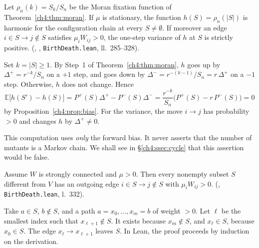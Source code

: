 \begin{proposition}\label{ch4:prop:harmgraph}
Let $\rho_n(k)=S_k/S_n$ be the Moran fixation function of Theorem~\ref{ch4:thm:moran}. If $\mu$ is
stationary, the function $h(S)=\rho_n(|S|)$ is harmonic for the configuration chain at every
$S\ne\emptyset$. If moreover an edge $i\in S\to j\notin S$ satisfies $\mu_iW_{ij}>0$, the one-step variance of $h$ at
$S$ is strictly positive. \tierA{} (, ,
\texttt{BirthDeath.lean}, ll.~285--328).
\end{proposition}

\begin{humanproof}
Set $k=|S|\ge1$. By Step~1 of Theorem~\ref{ch4:thm:moran}, $h$ goes up by $\Delta^{+}=r^{-k}/S_n$ on a
$+1$ step, and goes down by $\Delta^{-}=r^{-(k-1)}/S_n=r\,\Delta^{+}$ on a $-1$ step. Otherwise, $h$ does not change. Hence
\[
\mathbb E\bigl[h(S')-h(S)\bigr]=P^{+}(S)\Delta^{+}-P^{-}(S)\Delta^{-}=\frac{r^{-k}}{S_n}\bigl(P^{+}(S)-r\,P^{-}(S)\bigr)=0
\]
by Proposition~\ref{ch4:prop:bias}. For the variance, the move $i\to j$ has probability $>0$ and changes
$h$ by $\Delta^{+}\ne0$.
\end{humanproof}

This computation uses \emph{only} the forward bias. It never asserts that the number of mutants is a Markov
chain. We shall see in §\ref{ch4:ssec:cycle} that this assertion would be false.

\begin{lemma}\label{ch4:lem:conn}
Assume $W$ is strongly connected and $\mu>0$. Then every nonempty subset $S$ different from $V$ has an outgoing
edge $i\in S\to j\notin S$ with $\mu_iW_{ij}>0$. \tierA{} (,
\texttt{BirthDeath.lean}, l.~332).
\end{lemma}

\begin{humanproof}
Take $a\in S$, $b\notin S$, and a path $a=x_0,\dots,x_m=b$ of weight $>0$. Let $\ell$ be the smallest index such
that $x_{\ell+1}\notin S$. It exists because $x_m\notin S$, and $x_\ell\in S$, because $x_0\in S$. The edge
$x_\ell\to x_{\ell+1}$ leaves $S$. In Lean, the proof proceeds by induction on the  derivation.
\end{humanproof}

